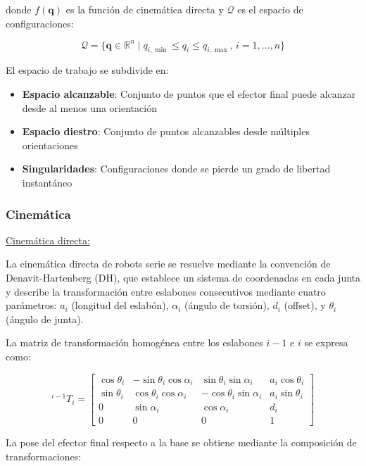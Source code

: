 donde $f(\mathbf{q})$ es la función de cinemática directa y $\mathcal{Q}$ es el espacio de configuraciones:

\begin{equation}
\mathcal{Q} = \{\mathbf{q} \in \mathbb{R}^n \mid q_{i,\min} \leq q_i \leq q_{i,\max}, \, i = 1, \ldots, n\}
\end{equation}

El espacio de trabajo se subdivide en:

\begin{itemize}[label=$\bullet$]
    \item \textbf{Espacio alcanzable}: Conjunto de puntos que el efector final puede alcanzar desde al menos una orientación
    \item \textbf{Espacio diestro}: Conjunto de puntos alcanzables desde múltiples orientaciones
    \item \textbf{Singularidades}: Configuraciones donde se pierde un grado de libertad instantáneo
\end{itemize}

\subsubsection{Cinemática}

\underline{Cinemática directa:}

La cinemática directa de robots serie se resuelve mediante la convención de Denavit-Hartenberg (DH), que establece un sistema de coordenadas en cada junta y describe la transformación entre eslabones consecutivos mediante cuatro parámetros: $a_i$ (longitud del eslabón), $\alpha_i$ (ángulo de torsión), $d_i$ (offset), y $\theta_i$ (ángulo de junta).

La matriz de transformación homogénea entre los eslabones $i-1$ e $i$ se expresa como:

\begin{equation}
{}^{i-1}T_i = 
\begin{bmatrix}
\cos\theta_i & -\sin\theta_i\cos\alpha_i & \sin\theta_i\sin\alpha_i & a_i\cos\theta_i \\
\sin\theta_i & \cos\theta_i\cos\alpha_i & -\cos\theta_i\sin\alpha_i & a_i\sin\theta_i \\
0 & \sin\alpha_i & \cos\alpha_i & d_i \\
0 & 0 & 0 & 1
\end{bmatrix}
\end{equation}

La pose del efector final respecto a la base se obtiene mediante la composición de transformaciones:

